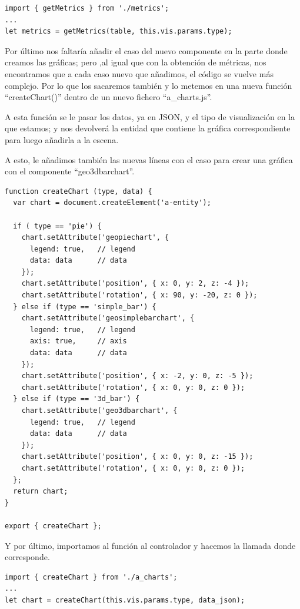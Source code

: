 \documentclass[a4paper, 12pt]{book}
\begin{document}
\begin{lstlisting}[frame=single]
import { getMetrics } from './metrics';
...
let metrics = getMetrics(table, this.vis.params.type);
\end{lstlisting}

Por último nos faltaría añadir el caso del nuevo componente en la parte donde creamos las gráficas; pero ,al igual que con la obtención de métricas, nos encontramos que a cada caso nuevo que añadimos, el código se vuelve más complejo. Por lo que los sacaremos también y lo metemos en una nueva función “createChart()” dentro de un nuevo fichero “a\_charts.js”.

A esta función se le pasar los datos, ya en JSON, y el tipo de visualización en la que estamos; y nos devolverá la entidad que contiene la gráfica correspondiente para luego añadirla a la escena.

A esto, le añadimos también las nuevas líneas con el caso para crear una gráfica con el componente “geo3dbarchart”.

\begin{lstlisting}[frame=single]
function createChart (type, data) {
  var chart = document.createElement('a-entity');

  if ( type == 'pie') {
    chart.setAttribute('geopiechart', {
      legend: true,   // legend
      data: data      // data
    });
    chart.setAttribute('position', { x: 0, y: 2, z: -4 });
    chart.setAttribute('rotation', { x: 90, y: -20, z: 0 });
  } else if (type == 'simple_bar') {
    chart.setAttribute('geosimplebarchart', {
      legend: true,   // legend
      axis: true,     // axis
      data: data      // data
    });
    chart.setAttribute('position', { x: -2, y: 0, z: -5 });
    chart.setAttribute('rotation', { x: 0, y: 0, z: 0 });
  } else if (type == '3d_bar') {
    chart.setAttribute('geo3dbarchart', {
      legend: true,   // legend
      data: data      // data
    });
    chart.setAttribute('position', { x: 0, y: 0, z: -15 });
    chart.setAttribute('rotation', { x: 0, y: 0, z: 0 });
  };
  return chart;
}

export { createChart };
\end{lstlisting}

Y por último, importamos al función al controlador y hacemos la llamada donde corresponde.

\begin{lstlisting}[frame=single]
import { createChart } from './a_charts';
...
let chart = createChart(this.vis.params.type, data_json);
\end{lstlisting}
\end{document}
